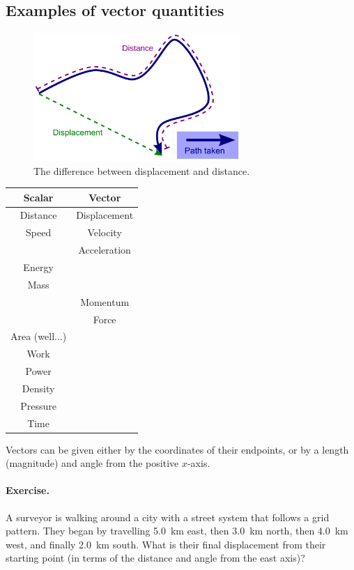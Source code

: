 \documentclass[a4paper]{amsbook}
\begin{document}
\subsection{Examples of vector quantities}
\begin{figure}
  \centering
  \includegraphics[width=0.7\textwidth]{displacement}
  \caption{The difference between displacement and distance.\label{fig:displacement}}
\end{figure}

\begin{center}
\begin{tabular}{c|c}
  \textbf{Scalar} & \textbf{Vector}\\\hline
  Distance & Displacement\\
  Speed & Velocity\\
  & Acceleration\\
  Energy &\\
  Mass &\\
  & Momentum\\
  & Force\\
  Area (well...) &\\
  Work &\\
  Power &\\
  Density &\\
  Pressure &\\
  Time &
\end{tabular}
\end{center}

Vectors can be given either by the coordinates of their endpoints, or by a length (magnitude) and angle from the positive $ x$-axis.

\paragraph{Exercise.} A surveyor is walking around a city with a street system that follows a grid pattern. They
began by travelling \SI{5.0}{\kilo\metre} east, then \SI{3.0}{\kilo\metre} north, then \SI{4.0}{\kilo\metre} west, and finally \SI{2.0}{\kilo\metre}
south. What is their final displacement from their starting point (in terms of the distance and angle from the east axis)?
\end{document}
